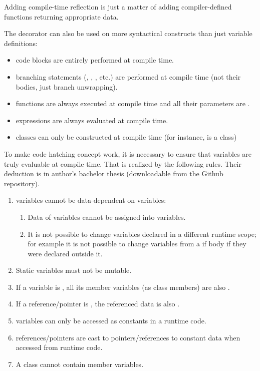 \documentclass{ExcelAtFIT}
\begin{document}
Adding compile-time reflection is just a matter of adding compiler-defined functions returning appropriate \ctime data.

The  decorator can also be used on more syntactical constructs than just variable definitions:
\begin{itemize}
	\item \ctime code blocks are entirely performed at compile time.
	\item \ctime branching statements (, , , etc.) are performed at compile time (not their bodies, just branch unwrapping).
	\item \ctime functions are always executed at compile time and all their parameters are \ctime.
	\item \ctime expressions are always evaluated at compile time.
	\item \ctime classes can only be constructed at compile time (for instance,  is a \ctime class)
\end{itemize}

To make code hatching concept work, it is necessary to ensure that \ctime variables are truly evaluable at compile time. That is realized by the following rules. Their deduction is in author's bachelor thesis \cite{MyThesis} (downloadable from the Github repository).
\begin{enumerate}
	\item \ctime variables cannot be data-dependent on \nonctime variables:
	\begin{enumerate}
		\item Data of \nonctime variables cannot be assigned into \ctime variables.
		\item It is not possible to change \ctime variables declared in a different runtime scope; for example it is not possible to change \ctime variables from a \nonctime if body if they were declared outside it.
	\end{enumerate}
	\item Static \ctime variables must not be mutable.
	\item If a variable is \ctime, all its member variables (as class members) are also \ctime.
	\item If a reference/pointer is \ctime, the referenced data is also \ctime.
	\item \ctime variables can only be accessed as constants in a runtime code.
	\item \ctime references/pointers are cast to pointers/references to constant data when accessed from runtime code.
	\item A \nonctime class cannot contain member \ctime variables.
\end{enumerate}
\end{document}
